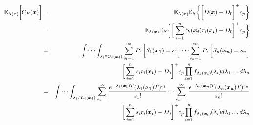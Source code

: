 \documentclass[preprint,12pt]{elsarticle}
\begin{document}
\begin{eqnarray}
\mathbb{E}_{\Lambda(\boldsymbol{x})}\bigg[C_{P}(\boldsymbol{x})\bigg] & = & \mathbb{E}_{\Lambda(\boldsymbol{x})}\mathbb{E}_{S}\bigg\{\bigg[D(\boldsymbol{x})-D_{0}\bigg]^{+} c_{p} \bigg\} \nonumber\\
&=& \mathbb{E}_{\Lambda(\boldsymbol{x})}\mathbb{E}_{S}\bigg\{\bigg[\sum_{i=1}^{n}{S_{i}(\boldsymbol{x_{i}})r_{i}(\boldsymbol{x_i})}-D_{0}\bigg]^{+} c_{p} \bigg\} \nonumber\\
&=&\idotsint_{\lambda_{i} \in \mathcal{O}_{i}(\boldsymbol{x_i})} \sum_{s_{1}=1}^{\infty}{Pr\bigg[S_{1}(\boldsymbol{x_{1}})=s_{1}\bigg]}\dots\sum_{s_{n}=1}^{\infty}{Pr\bigg[S_{n}(\boldsymbol{x_{n}})=s_{n}\bigg]} \nonumber\\
 &&\bigg[\sum_{i=1}^{n}{s_{i}r_{i}(\boldsymbol{x_{i}})}-D_{0}\bigg]^{+}c_{p}\prod_{i=1}^{n}{f_{\Lambda_{i}(\boldsymbol{x_{i}})}(\lambda_{i})d\lambda_{1}\dots d\lambda_{n}} \nonumber\\
&=& \idotsint_{\lambda_{i} \in \mathcal{O}_{i}(\boldsymbol{x_i})} \sum_{s_{1}=1}^{\infty}{ \frac{e^{-\lambda_{1}(\boldsymbol{x_{1}})T}(\lambda_{1}(\boldsymbol{x_{1}})T)^{s_{1}}}{s_{1}!}}\dots\sum_{s_{n}=1}^{\infty}{\frac{e^{-\lambda_{n}(\boldsymbol{x_{n}})T}(\lambda_{n}(\boldsymbol{x_{n}})T)^{s_{n}}}{s_{n}!}} \nonumber\\
 &&\bigg[\sum_{i=1}^{n}{s_{i}r_{i}(\boldsymbol{x_{i}})}-D_{0}\bigg]^{+}c_{p}\prod_{i=1}^{n}{f_{\Lambda_{i}(\boldsymbol{x_{i}})}(\lambda_{i})d\lambda_{1}\dots d\lambda_{n}} \nonumber
\end{eqnarray}
\end{document}
